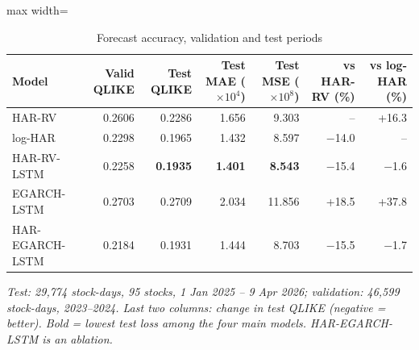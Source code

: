 \begin{table}[htbp]
\centering
\caption{Forecast accuracy, validation and test periods}
\label{tab:overall}
\small
\begin{adjustbox}{max width=\textwidth}
\begin{tabular}{lrrrrrr}
\toprule
Model & Valid QLIKE & Test QLIKE & Test MAE ($\times10^{4}$) & Test MSE ($\times10^{8}$) & vs HAR-RV (\%) & vs log-HAR (\%) \\
\midrule
HAR-RV & 0.2606 & 0.2286 & 1.656 & 9.303 & -- & +16.3 \\
log-HAR & 0.2298 & 0.1965 & 1.432 & 8.597 & $-$14.0 & -- \\
HAR-RV-LSTM & 0.2258 & \textbf{0.1935} & \textbf{1.401} & \textbf{8.543} & $-$15.4 & $-$1.6 \\
EGARCH-LSTM & 0.2703 & 0.2709 & 2.034 & 11.856 & +18.5 & +37.8 \\
\midrule
HAR-EGARCH-LSTM & 0.2184 & 0.1931 & 1.444 & 8.703 & $-$15.5 & $-$1.7 \\
\bottomrule
\end{tabular}
\end{adjustbox}
\par\smallskip\parbox{0.95\textwidth}{\footnotesize\itshape Test: 29,774 stock-days, 95 stocks, 1 Jan 2025 -- 9 Apr 2026; validation: 46,599 stock-days, 2023--2024. Last two columns: change in test QLIKE (negative = better). Bold = lowest test loss among the four main models. HAR-EGARCH-LSTM is an ablation.}
\end{table}
